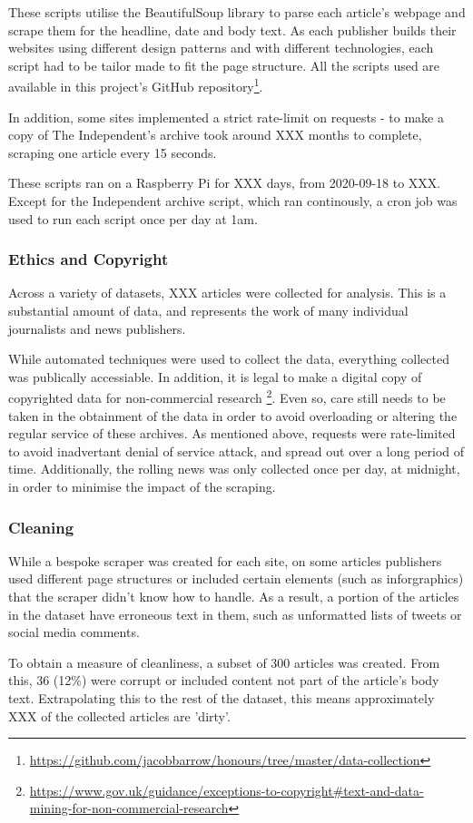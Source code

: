 These scripts utilise the BeautifulSoup library to parse each article's webpage and scrape them for the headline, date and body text. As each publisher builds their websites using different design patterns and with different technologies, each script had to be tailor made to fit the page structure. All the scripts used are available in this project's GitHub repository\footnote{\url{https://github.com/jacobbarrow/honours/tree/master/data-collection}}.

In addition, some sites implemented a strict rate-limit on requests - to make a copy of The Independent's archive took around XXX months to complete, scraping one article every 15 seconds. 

These scripts ran on a Raspberry Pi for XXX days, from 2020-09-18 to XXX. Except for the Independent archive script, which ran continously, a cron job was used to run each script once per day at 1am.

\subsubsection{Ethics and Copyright}
Across a variety of datasets, XXX articles were collected for analysis. This is a substantial amount of data, and represents the work of many individual journalists and news publishers. 

While automated techniques were used to collect the data, everything collected was publically accessiable. In addition, it is legal to make a digital copy of copyrighted data for non-commercial research \footnote{\url{https://www.gov.uk/guidance/exceptions-to-copyright#text-and-data-mining-for-non-commercial-research}}. Even so, care still needs to be taken in the obtainment of the data in order to avoid overloading or altering the regular service of these archives. As mentioned above, requests were rate-limited to avoid inadvertant denial of service attack, and spread out over a long period of time. Additionally, the rolling news was only collected once per day, at midnight, in order to minimise the impact of the scraping.

\subsubsection{Cleaning}
While a bespoke scraper was created for each site, on some articles publishers used different page structures or included certain elements (such as inforgraphics) that the scraper didn't know how to handle. As a result, a portion of the articles in the dataset have erroneous text in them, such as unformatted lists of tweets or social media comments.

To obtain a measure of cleanliness, a subset of 300 articles was created. From this, 36 (12\%) were corrupt or included content not part of the article's body text. Extrapolating this to the rest of the dataset, this means approximately XXX of the collected articles are 'dirty'.
